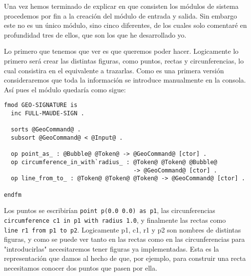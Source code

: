 
Una vez hemos terminado de explicar en que consisten los módulos de sistema procedemos por fin a la creación del módulo de entrada y salida. Sin embargo este no es un único módulo, sino cinco diferentes, de los cuales solo comentaré en profundidad tres de ellos, que son los que he desarrollado yo. \par

Lo primero que tenemos que ver es que queremos poder hacer. Logicamente lo primero será crear las distintas figuras, como puntos, rectas y circunferencias, lo cual consistira en el equivalente a trazarlas. Como es una primera versión consideraremos que toda la información se introduce manualmente en la consola. Así pues el módulo quedaría como sigue: \par

{\codesize
\begin{verbatim}
fmod GEO-SIGNATURE is
  inc FULL-MAUDE-SIGN .

  sorts @GeoCommand@ .
  subsort @GeoCommand@ < @Input@ .

  op point_as_ : @Bubble@ @Token@ -> @GeoCommand@ [ctor] .
  op circumference_in_with`radius_ : @Token@ @Token@ @Bubble@ 
                                     -> @GeoCommand@ [ctor] .
  op line_from_to_ : @Token@ @Token@ @Token@ -> @GeoCommand@ [ctor] .

endfm
\end{verbatim}
}

Los puntos se escribirían \verb"point p(0.0 0.0) as p1", las circunferencias\\ \verb"circumference c1 in p1 with radius 1.0", y finalmente las rectas como\\ \verb"line r1 from p1 to p2". Logicamente p1, c1, r1 y p2 son nombres de distintas figuras, y como se puede ver tanto en las rectas como en las circunferencias para "introducirlas" necesitaremos tener figuras ya implementadas. Esta es la representación que damos al hecho de que, por ejemplo, para construir una recta necesitamos conocer dos puntos que pasen por ella.\par

